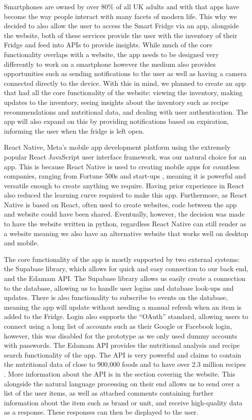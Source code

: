 Smartphones are owned by over 80\% \cite{stat} of all UK adults and with that apps have become the way people interact with many facets of modern life.
This why we decided to also allow the user to access the Smart Fridge via an app, alongside the website, both of these services provide the user with the inventory of their Fridge and feed into APIs to provide insights.
While much of the core functionality overlaps with a website, the app needs to be designed very differently to work on a smartphone however the medium also provides opportunities such as sending notifications to the user as well as having a camera connected directly to the device.
With this in mind, we planned to create an app that had all the core functionality of the website: viewing the inventory, making updates to the inventory, seeing insights about the inventory such as recipe recommendations and nutritional data, and dealing with user authentication.
The app will also expand on this by providing notifications based on expiration, informing the user when the fridge is left open.

React Native, Meta's mobile app development platform using the extremely popular React JavaScript user interface framework, was our natural choice for an app.
This is because React Native is used to creating mobile apps for countless companies, ranging from Fortune 500s and start-ups \cite{react}, meaning it is powerful and versatile enough to create anything we require.
Having prior experience in React also reduced the learning curve required to make this app.
Furthermore, as React Native is based on React, often used to create websites, code between the app and website could have been shared.
Eventually, however, the decision was made to have the website written in python, regardless React Native can still render as a website meaning we also have an alternative website that works well on desktop and mobile.

The core functionality of the app is mostly supported by two external systems: the Supabase library, which allows for quick and easy connection to our back end, and the Edamam API.
The Supabase library allows us easily create a connection to the database, allowing us to handle user logins and database look-ups and updates.
There is also functionality to subscribe to events on the database, meaning the app will update without needing a manual refresh when an item is added to the Fridge.
Login also supports the “OAuth” standard, allowing users to connect using a long list of accounts such as their Google or Facebook login, however, this was disabled for the prototype as we only used dummy accounts with passwords.
The Edamam API provides the nutritional analysis and recipe search functionality of the app.
The API is very powerful and claims to contain the nutritional data of close to 900,000 foods and to have over 2.3 million recipes \cite{edman}.
More information about the API is in the section covering the website.
This alongside the natural language processing on their end allows us to send over a list of the user items, as well as attached comments containing further information about the item such as brand or unit, and receive high-quality data as a response.
These responses can then be displayed to the user.

